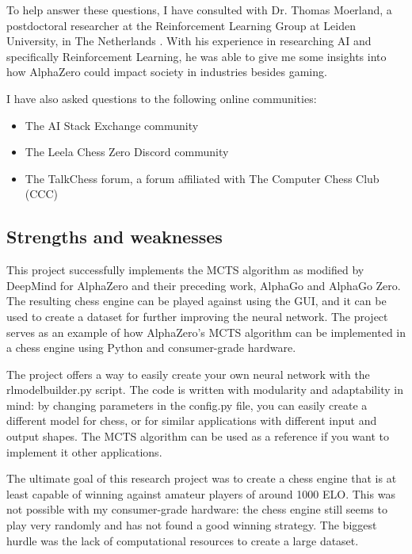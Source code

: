 \documentclass{article}
\begin{document}
To help answer these questions, I have consulted with Dr. Thomas Moerland, a postdoctoral 
researcher at the Reinforcement Learning Group at Leiden University, in The Netherlands \cite{ThomasMoerlandPostdoc}. 
With his experience in researching AI and specifically Reinforcement Learning, he was able 
to give me some insights into how AlphaZero could impact society in industries besides gaming.

I have also asked questions to the following online communities:

\begin{itemize}
    \item The AI Stack Exchange community %
    \item The Leela Chess Zero Discord community 
    \item The TalkChess forum, a forum affiliated with The Computer Chess Club (CCC)
\end{itemize}

\subsection{Strengths and weaknesses}

This project successfully implements the MCTS algorithm as modified by DeepMind for AlphaZero and their preceding work,
AlphaGo and AlphaGo Zero. The resulting chess engine can be played against using the GUI, and it can be used to create
a dataset for further improving the neural network. The project serves as an example of how AlphaZero's MCTS algorithm 
can be implemented in a chess engine using Python and consumer-grade hardware. 

The project offers a way to easily create your own neural network with the rlmodelbuilder.py script.
The code is written with modularity and adaptability in mind: by changing parameters in the config.py file, 
you can easily create a different model for chess, or for similar applications with different input and output shapes. 
The MCTS algorithm can be used as a reference if you want to implement it other applications.

The ultimate goal of this research project was to create a chess engine that is at least capable of winning
against amateur players of around 1000 ELO. This was not possible with my consumer-grade hardware: 
the chess engine still seems to play very randomly and has not found a good winning strategy. 
The biggest hurdle was the lack of computational resources to create a large dataset.
\end{document}
